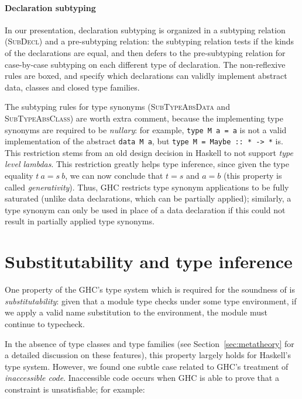 \paragraph{Declaration subtyping}
In our presentation, declaration subtyping is organized in a subtyping
relation (\textsc{SubDecl}) and a pre-subtyping relation: the subtyping
relation tests if the kinds of the declarations are equal, and then
defers to the pre-subtyping relation for case-by-case subtyping on each
different type of declaration.  The non-reflexive rules are boxed,
and specify which declarations can validly implement abstract data,
classes and closed type families.

The subtyping rules for type synonyms (\textsc{SubTypeAbsData} and
\textsc{SubTypeAbsClass}) are worth extra comment, because the implementing
type synonyms are required to be \emph{nullary}: for example, \verb|type M a = a|
is not a valid implementation of the abstract \verb|data M a|,
but \verb|type M = Maybe :: * -> *| is.  This restriction
stems from an old design decision in Haskell to not support \emph{type level
lambdas}.  This restriction greatly helps type inference, since given the
type equality $t~a = s~b$, we can now conclude that $t = s$ and $a = b$
(this property is called \emph{generativity}).  Thus, GHC restricts type
synonym applications to be fully saturated (unlike data declarations, which can
be partially applied); similarly, a type synonym can only be used in place
of a data declaration if this could not result in partially applied type
synonyms.

\section{Substitutability and type inference}
\label{sec:substitutability}

One property of the GHC's type system which is required for
the soundness of \Backpack{} is \emph{substitutability}: given that
a module type checks under some type environment, if we apply a
valid name substitution to the environment, the module must
continue to typecheck.

In the absence of type classes and type families (see
Section~\ref{sec:metatheory} for a detailed discussion on these
features), this property largely holds for Haskell's type system.
However, we found one subtle case related to GHC's treatment
of \emph{inaccessible code}.  Inaccessible code occurs when
GHC is able to prove that a constraint is unsatisfiable; for
example:

